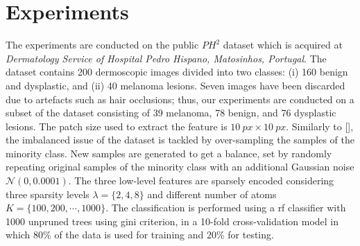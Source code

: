 \section{Experiments}
\label{sec:exp}
The experiments are conducted on the public $PH^2$ dataset which is acquired at \textit{Dermatology Service of Hospital Pedro Hispano, Matosinhos, Portugal}. 
The dataset contains 200 dermoscopic images divided into two classes: (i) 160 benign and dysplastic, and (ii) 40 melanoma lesions. 
Seven images have been discarded due to artefacts such as hair occlusions; thus, our experiments are conducted on a subset of the dataset consisting of 39 melanoma, 78 benign, and 76 dysplastic lesions.
The patch size used to extract the feature is $\SI{10}{px} \times \SI{10}{px}$.
Similarly to [], the imbalanced issue of the dataset is tackled by over-sampling the samples of the minority class.
New samples are generated to get a balance, set by randomly repeating original samples of the minority class with an additional Gaussian noise $\mathcal{N}(0, 0.0001)$.
The three low-level features are sparsely encoded considering three sparsity levels $\lambda=\{2,4,8\}$ and different number of atoms $K = \{100, 200, \cdots, 1000\}$.
The classification is performed using a \ac{rf} classifier with 1000 unpruned trees using gini criterion, in a 10-fold cross-validation model in which 80\% of the data is used for training and 20\% for testing. 
 